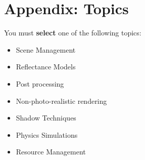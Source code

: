 \documentclass{../../fal_assignment}
\begin{document}
	\section*{Appendix: Topics}
	
	You must \textbf{select} one of the following topics:
	
	\begin{itemize}
		\item Scene Management
		\item Reflectance Models
		\item Post processing
		\item Non-photo-realistic rendering
		\item Shadow Techniques
		\item Physics Simulations
		\item Resource Management
	\end{itemize}
\end{document}
